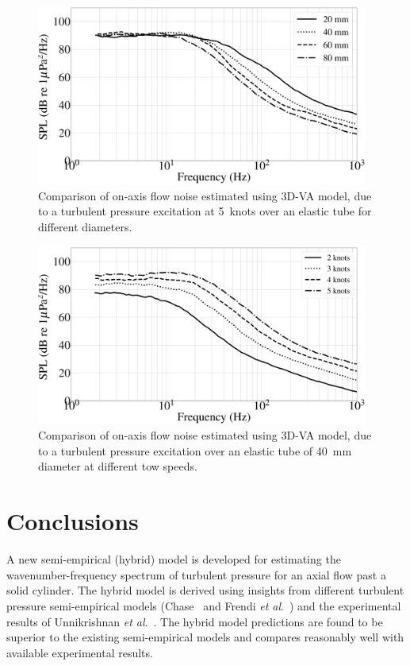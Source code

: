 \documentclass[11pt,cleanfoot]{asme2ej}
\begin{document}
\begin{figure}
    \centerline{
    \includegraphics[width=4.3in]{Comparison_of_flow_noise_3D_different_dia.eps}}
    \caption{Comparison of on-axis flow noise estimated using 3D-VA model, due to a turbulent pressure excitation at 5~knots over an elastic tube for different diameters.}
    \label{flow noise diff dia 3d}
\end{figure}
\begin{figure}
    \centerline{
    \includegraphics[width=4.3in]{Comparison_of_flow_noise_3D_Different_speed.eps}}
    \caption{Comparison of on-axis flow noise estimated using 3D-VA model, due to a turbulent pressure excitation over an elastic tube of 40~mm diameter at different tow speeds.}
    \label{flow noise diff speed 3d}
\end{figure}



\section{Conclusions}
A new semi-empirical (hybrid) model is developed for estimating the wavenumber-frequency spectrum of turbulent pressure for an axial flow past a solid cylinder. The hybrid model is derived using insights from different turbulent pressure semi-empirical models (Chase~\cite{Chase1981} and Frendi \textit{et al}.~\cite{frendi2020}) and the experimental results of Unnikrishnan \textit{et al}.~\cite{Unni2011}. The hybrid model predictions are found to be superior to the existing semi-empirical models and compares reasonably well with available experimental results. 
\end{document}
